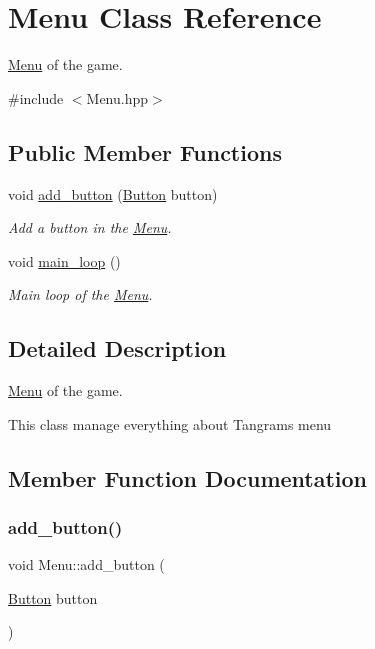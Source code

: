 \hypertarget{classMenu}{}\section{Menu Class Reference}
\label{classMenu}


\hyperlink{classMenu}{Menu} of the game.  




{\ttfamily \#include $<$Menu.\+hpp$>$}

\subsection*{Public Member Functions}
\begin{DoxyCompactItemize}
\item 
void \hyperlink{classMenu_a8ef6225670f1cda6ae8b74ece900bdd4}{add\+\_\+button} (\hyperlink{classButton}{Button} button)
\begin{DoxyCompactList}\small\item\em Add a button in the \hyperlink{classMenu}{Menu}. \end{DoxyCompactList}\item 
\mbox{\label{classMenu_a02baf39291517cea771a2e1cffed960e}} 
void \hyperlink{classMenu_a02baf39291517cea771a2e1cffed960e}{main\+\_\+loop} ()
\begin{DoxyCompactList}\small\item\em Main loop of the \hyperlink{classMenu}{Menu}. \end{DoxyCompactList}\end{DoxyCompactItemize}


\subsection{Detailed Description}
\hyperlink{classMenu}{Menu} of the game. 

This class manage everything about Tangram\textquotesingle{}s menu 

\subsection{Member Function Documentation}
\mbox{\label{classMenu_a8ef6225670f1cda6ae8b74ece900bdd4}} 
\subsubsection{\texorpdfstring{add\+\_\+button()}{add\_button()}}
{\footnotesize\ttfamily void Menu\+::add\+\_\+button (\begin{DoxyParamCaption}\item[{\hyperlink{classButton}{Button}}]{button }\end{DoxyParamCaption})}



